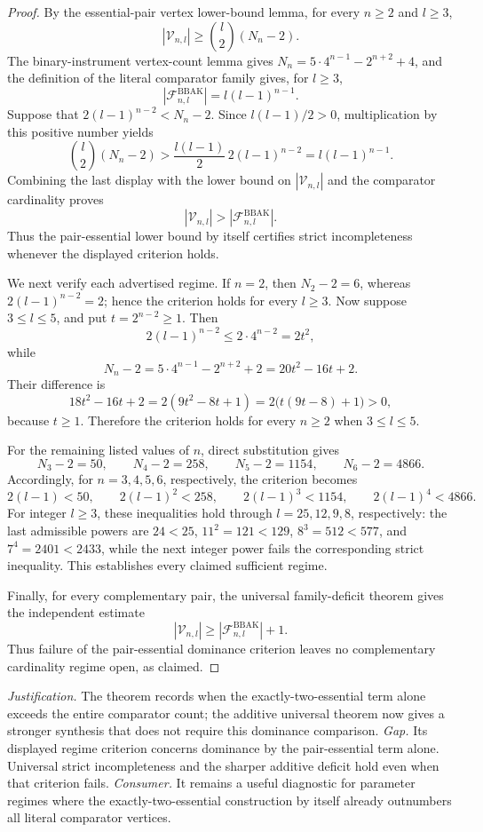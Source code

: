 \documentclass{article}
\begin{document}
\begin{proof}
By the essential-pair vertex lower-bound lemma, for every \(n\ge 2\) and \(l\ge 3\),
\[|\mathcal V_{n,l}|\ge \binom{l}{2}(N_n-2).\]
The binary-instrument vertex-count lemma gives \(N_n=5\cdot 4^{n-1}-2^{n+2}+4\), and the definition of the literal comparator family gives, for \(l\ge3\),
\[|\mathcal F^{\mathrm{BBAK}}_{n,l}|=l(l-1)^{n-1}.\]
Suppose that \(2(l-1)^{n-2}<N_n-2\). Since \(l(l-1)/2>0\), multiplication by this positive number yields
\[\binom{l}{2}(N_n-2)>\frac{l(l-1)}{2}\,2(l-1)^{n-2}=l(l-1)^{n-1}.\]
Combining the last display with the lower bound on \(|\mathcal V_{n,l}|\) and the comparator cardinality proves
\[|\mathcal V_{n,l}|>|\mathcal F^{\mathrm{BBAK}}_{n,l}|.\]
Thus the pair-essential lower bound by itself certifies strict incompleteness whenever the displayed criterion holds.

We next verify each advertised regime. If \(n=2\), then \(N_2-2=6\), whereas \(2(l-1)^{n-2}=2\); hence the criterion holds for every \(l\ge3\). Now suppose \(3\le l\le5\), and put \(t=2^{n-2}\ge1\). Then
\[2(l-1)^{n-2}\le2\cdot4^{n-2}=2t^2,\]
while
\[N_n-2=5\cdot4^{n-1}-2^{n+2}+2=20t^2-16t+2.\]
Their difference is
\[18t^2-16t+2=2(9t^2-8t+1)=2\bigl(t(9t-8)+1\bigr)>0,\]
because \(t\ge1\). Therefore the criterion holds for every \(n\ge2\) when \(3\le l\le5\).

For the remaining listed values of \(n\), direct substitution gives
\[N_3-2=50,\qquad N_4-2=258,\qquad N_5-2=1154,\qquad N_6-2=4866.\]
Accordingly, for \(n=3,4,5,6\), respectively, the criterion becomes
\[2(l-1)<50,\qquad 2(l-1)^2<258,\qquad 2(l-1)^3<1154,\qquad 2(l-1)^4<4866.\]
For integer \(l\ge3\), these inequalities hold through \(l=25,12,9,8\), respectively: the last admissible powers are \(24<25\), \(11^2=121<129\), \(8^3=512<577\), and \(7^4=2401<2433\), while the next integer power fails the corresponding strict inequality. This establishes every claimed sufficient regime.

Finally, for every complementary pair, the universal family-deficit theorem gives the independent estimate
\[|\mathcal V_{n,l}|\ge |\mathcal F^{\mathrm{BBAK}}_{n,l}|+1.\]
Thus failure of the pair-essential dominance criterion leaves no complementary cardinality regime open, as claimed.
\end{proof}
\par\smallskip\noindent \textit{Justification.} The theorem records when the exactly-two-essential term alone exceeds the entire comparator count; the additive universal theorem now gives a stronger synthesis that does not require this dominance comparison. \textit{Gap.} Its displayed regime criterion concerns dominance by the pair-essential term alone. Universal strict incompleteness and the sharper additive deficit hold even when that criterion fails. \textit{Consumer.} It remains a useful diagnostic for parameter regimes where the exactly-two-essential construction by itself already outnumbers all literal comparator vertices.
\end{document}
